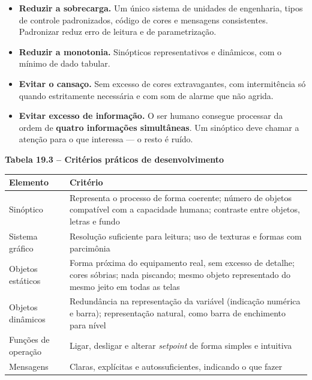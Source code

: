 \begin{itemize}
\tightlist
\item
  \textbf{Reduzir a sobrecarga.} Um único sistema de unidades de engenharia, tipos de controle
  padronizados, código de cores e mensagens consistentes. Padronizar reduz erro de leitura e de
  parametrização.
\item
  \textbf{Reduzir a monotonia.} Sinópticos representativos e dinâmicos, com o mínimo de dado tabular.
\item
  \textbf{Evitar o cansaço.} Sem excesso de cores extravagantes, com intermitência só quando estritamente
  necessária e com som de alarme que não agrida.
\item
  \textbf{Evitar excesso de informação.} O ser humano consegue processar da ordem de \textbf{quatro informações
  simultâneas}. Um sinóptico deve chamar a atenção para o que interessa --- o resto é ruído.
\end{itemize}

\textbf{Tabela 19.3 -- Critérios práticos de desenvolvimento}

\begin{longtable}[]{@{}
  >{\raggedright\arraybackslash}p{}
  >{\raggedright\arraybackslash}p{}@{}}
\toprule\noalign{}
\begin{minipage}[b]{\linewidth}\raggedright
Elemento
\end{minipage} & \begin{minipage}[b]{\linewidth}\raggedright
Critério
\end{minipage} \\
\midrule\noalign{}
\endhead
\bottomrule\noalign{}
\endlastfoot
Sinóptico & Representa o processo de forma coerente; número de objetos compatível com a capacidade humana; contraste entre objetos, letras e fundo \\
Sistema gráfico & Resolução suficiente para leitura; uso de texturas e formas com parcimônia \\
Objetos estáticos & Forma próxima do equipamento real, sem excesso de detalhe; cores sóbrias; nada piscando; mesmo objeto representado do mesmo jeito em todas as telas \\
Objetos dinâmicos & Redundância na representação da variável (indicação numérica e barra); representação natural, como barra de enchimento para nível \\
Funções de operação & Ligar, desligar e alterar \emph{setpoint} de forma simples e intuitiva \\
Mensagens & Claras, explícitas e autossuficientes, indicando o que fazer \\
\end{longtable}


